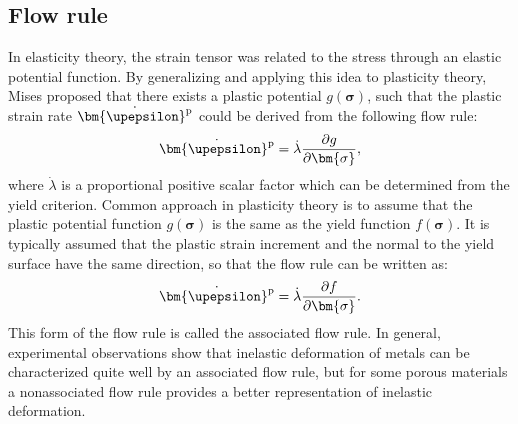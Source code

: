 \subsection{Flow rule}
\noindent
In elasticity theory, the strain tensor was related to the stress through an elastic potential function.
By generalizing and applying this idea to plasticity theory, Mises proposed that there exists a plastic potential $g(\bm{\sigma})$, such that the plastic strain rate $\dot{{\bm{\upepsilon }}^{\rm{p}}}$ could be derived from the following flow rule:
\begin{equation}
\dot{{\bm{\upepsilon }}^{\rm{p}}} = \dot\lambda \frac{\partial g}{\partial \bm{\sigma}},
\label{Equ:dgdsigma}
\end{equation}
where $\dot\lambda$ is a proportional positive scalar factor which can be determined from the yield criterion. 
Common approach in plasticity theory is to assume that the plastic potential function $g(\bm{\sigma})$ is the same as the yield function $f(\bm{\sigma})$.
It is typically assumed that the plastic strain increment and the normal to the yield surface have the same direction, so that the flow rule can be written as:
\begin{equation}
\dot{{\bm{\upepsilon }}^{\rm{p}}} = \dot\lambda \frac{\partial f}{\partial \bm{\sigma}}.
\end{equation}
This form of the flow rule is called the associated flow rule.
In general, experimental observations show that inelastic deformation of metals can be characterized quite well by an associated flow rule, but for some porous materials a nonassociated flow rule provides a better representation of inelastic deformation.

